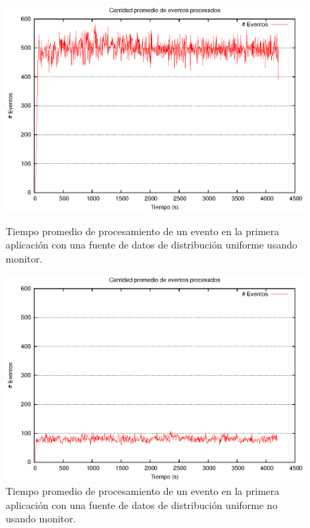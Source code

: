 \begin{figure}[ht]
\centering

\begin{minipage}[c]{0.45\textwidth}
\centering
    \includegraphics[width=\textwidth]{images/exp/app1/uniform/cm/avgEventProcess.eps}
    \caption{Tiempo promedio de procesamiento de un evento en la primera aplicación con una fuente de datos de distribución uniforme usando monitor.}
    \label{fig:app1-uniform-cm-avgEventProcess}
\end{minipage} \hspace*{1cm}
\begin{minipage}[c]{0.45\textwidth}
\centering
    \includegraphics[width=\textwidth]{images/exp/app1/uniform/sm/avgEventProcess.eps}
    \caption{Tiempo promedio de procesamiento de un evento en la primera aplicación con una fuente de datos de distribución uniforme no usando monitor.}
    \label{fig:app1-uniform-sm-avgEventProcess}
\end{minipage}

\end{figure}


